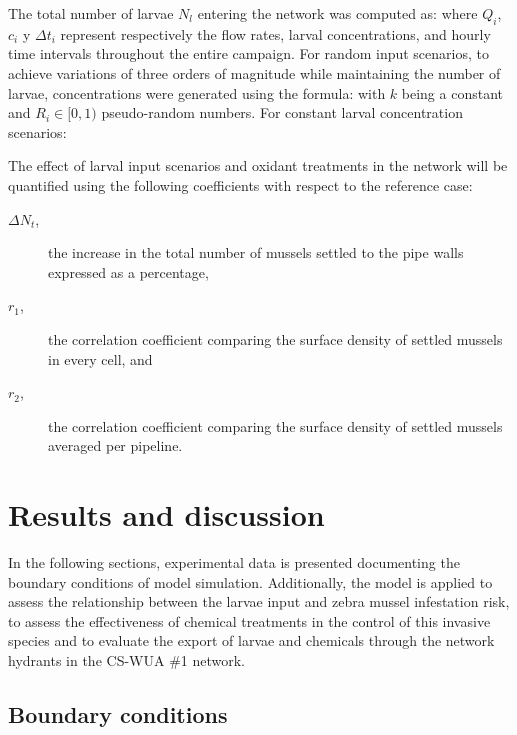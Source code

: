 \documentclass[review,authoryear]{elsarticle}
\begin{document}
The total number of larvae $N_l$ entering the network was computed as:
where $Q_i$, $c_i$ y $\Delta t_i$ represent respectively the flow rates, larval
concentrations, and hourly time intervals throughout the entire campaign. For
random input scenarios, to achieve variations of three orders of magnitude while
maintaining the number of larvae, concentrations were generated using the
formula:
with $k$ being a constant and $R_i\in[0,1)$ pseudo-random numbers. For constant
larval concentration scenarios:

The effect of larval input scenarios and oxidant treatments in the network will
be quantified using the following coefficients with respect to the reference
case:
\begin{description}
	\item[$\Delta N_t$,] the increase in the total number of mussels
		settled to the pipe walls expressed as a percentage,
	\item[$r_1$,] the correlation coefficient comparing the surface density
		of settled mussels in every cell, and
	\item[$r_2$,] the correlation coefficient comparing the surface density
		of settled mussels averaged per pipeline.
\end{description}

\section{Results and discussion}

In the following sections, experimental data is presented documenting the
boundary conditions of model simulation. Additionally, the model is applied to
assess the relationship between the larvae input and zebra mussel infestation
risk, to assess the effectiveness of chemical treatments in the control of
this invasive species and to evaluate the export of larvae and chemicals through
the network hydrants in the CS-WUA \#1 network.

\subsection{Boundary conditions}
\end{document}
